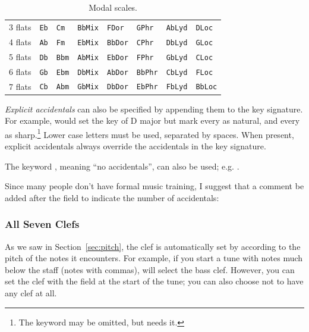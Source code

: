 \documentclass[a4paper,fullpage,12pt]{book}
\begin{document}
\begin{table}[h]
\begin{tabular}{llllllll}
3 flats  & \texttt{Eb}  &  \texttt{Cm}   & \texttt{BbMix}  &
\texttt{FDor}   & \texttt{GPhr}   & \texttt{AbLyd}  & \texttt{DLoc} \\

4 flats  & \texttt{Ab}  &  \texttt{Fm}   & \texttt{EbMix}  &
\texttt{BbDor}  & \texttt{CPhr}   & \texttt{DbLyd}  & \texttt{GLoc} \\

5 flats  & \texttt{Db}  &  \texttt{Bbm}  & \texttt{AbMix}  &
\texttt{EbDor}  & \texttt{FPhr}   & \texttt{GbLyd}  & \texttt{CLoc} \\

6 flats  & \texttt{Gb}  &  \texttt{Ebm}  & \texttt{DbMix}  &
\texttt{AbDor}  & \texttt{BbPhr}  & \texttt{CbLyd}  & \texttt{FLoc} \\

7 flats  & \texttt{Cb}  &  \texttt{Abm}  & \texttt{GbMix}  &
\texttt{DbDor}  & \texttt{EbPhr}  & \texttt{FbLyd}  & \texttt{BbLoc} \\
\bottomrule %
\end{tabular}
\caption{Modal scales.}
\label{tab:modes}
\end{table}

\emph{Explicit accidentals} can also be specified by appending them to
the key signature. For example,  would set the
key of D major but mark every  as natural, and every  as
sharp.\footnote{The keyword  may be omitted, but \abcmid{}
needs it.} Lower case letters must be used, separated by spaces. When
present, explicit accidentals always override the accidentals in the
key signature.

The keyword , meaning ``no accidentals'', can also be
used; e.g. .

Since many people don't have formal music training, I suggest that a
comment be added after the  field to indicate the number of
accidentals: 


\subsubsection{All Seven Clefs}

As we saw in Section~\ref{sec:pitch}, the clef is automatically set by
\abcm{} according to the pitch of the notes it encounters. For
example, if you start a tune with notes much below the staff (notes
with commas), \abcm{} will select the bass clef. However, you can set
the clef with the  field at the start of the tune; you can
also choose not to have any clef at all.
\end{document}
